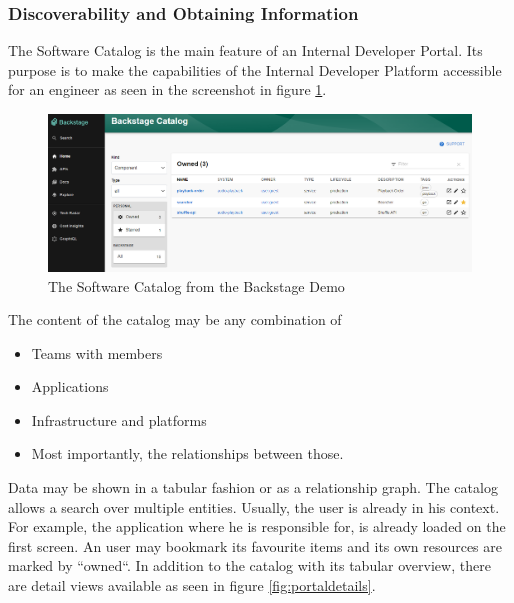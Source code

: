 \documentclass[a4paper,12pt]{article}
\begin{document}
    \subsubsection{Discoverability and Obtaining Information}
    \label{sssec:disc}
    The Software Catalog is the main feature of an Internal Developer Portal.
    Its purpose is to make the capabilities of the Internal Developer Platform accessible for an engineer as seen in the
    screenshot in figure \ref{fig:catalog}.\\

    \begin{figure}[h]
        \includegraphics[width=\linewidth]{backstage_catalog}
        \caption{The Software Catalog from the Backstage Demo\parencite{backstagedemo}}
        \label{fig:catalog}
    \end{figure}
    The content of the catalog may be any combination of
    \begin{itemize}
        \item Teams with members
        \item Applications
        \item Infrastructure and platforms
        \item Most importantly, the relationships between those.
    \end{itemize}
    Data may be shown in a tabular fashion or as a relationship graph.
    The catalog allows a search over multiple entities.
    Usually, the user is already in his context.
    For example, the application where he is responsible for, is already loaded on the first screen.
    An user may bookmark its favourite items and its own resources are marked by ``owned``.
    In addition to the catalog with its tabular overview, there are detail views available as seen in figure \ref{fig:portaldetails}.
\end{document}

